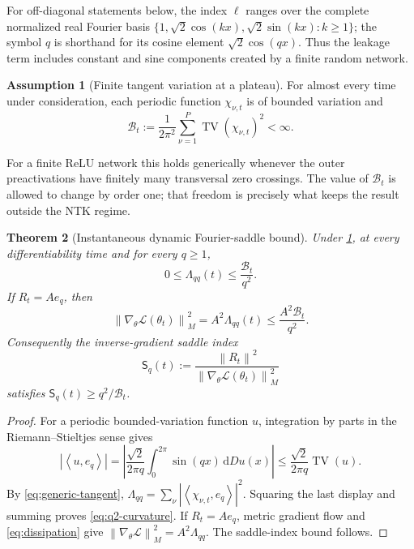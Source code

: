 \documentclass[11pt]{article}
\newcommand{\1}{\mathbf 1}
\newcommand{\ip}[2]{\left\langle #1,#2\right\rangle}
\newcommand{\norm}[1]{\left\lVert #1\right\rVert}
\newcommand{\TV}{\operatorname{TV}}
\newcommand{\dd}{\mathrm d}
\newcommand{\cL}{\mathcal L}
\newcommand{\cB}{\mathcal B}
\theoremstyle{plain}
\newtheorem{theorem}{Theorem}[section]
\theoremstyle{definition}
\newtheorem{assumption}[theorem]{Assumption}
\begin{document}
For off-diagonal statements below, the index \(\ell\) ranges over the
complete normalized real Fourier basis
\(\{1,\sqrt2\cos(kx),\sqrt2\sin(kx):k\ge1\}\); the symbol \(q\) is shorthand
for its cosine element \(\sqrt2\cos(qx)\).  Thus the leakage term includes
constant and sine components created by a finite random network.

\begin{assumption}[Finite tangent variation at a plateau]
\label{ass:BV}
For almost every time under consideration, each periodic function
\(\chi_{\nu,t}\) is of bounded variation and
\begin{equation}
 \cB_t:=\frac1{2\pi^2}\sum_{\nu=1}^P
 \TV(\chi_{\nu,t})^2<\infty.
 \label{eq:variation-budget}
\end{equation}
\end{assumption}

For a finite ReLU network this holds generically whenever the outer
preactivations have finitely many transversal zero crossings.  The value of
\(\cB_t\) is allowed to change by order one; that freedom is precisely what
keeps the result outside the NTK regime.

\begin{theorem}[Instantaneous dynamic Fourier-saddle bound]
\label{thm:dynamic-saddle}
Under \cref{ass:BV}, at every differentiability time and for every \(q\ge1\),
\begin{equation}
 0\leq\Lambda_{qq}(t)\leq\frac{\cB_t}{q^2}.
 \label{eq:q2-curvature}
\end{equation}
If \(R_t=Ae_q\), then
\begin{equation}
 \norm{\nabla_\theta\cL(\theta_t)}_{M}^2
 =A^2\Lambda_{qq}(t)
 \leq\frac{A^2\cB_t}{q^2}.
 \label{eq:gradient-bound}
\end{equation}
Consequently the inverse-gradient saddle index
\begin{equation}
 \mathsf S_q(t):=\frac{\norm{R_t}^2}
 {\norm{\nabla_\theta\cL(\theta_t)}_{M}^2}
 \label{eq:saddle-index}
\end{equation}
satisfies \(\mathsf S_q(t)\ge q^2/\cB_t\).
\end{theorem}

\begin{proof}
For a periodic bounded-variation function \(u\), integration by parts in
the Riemann--Stieltjes sense gives
\[
 \left|\ip{u}{e_q}\right|
 =\left|\frac{\sqrt2}{2\pi q}\int_0^{2\pi}\sin(qx)\,\dd Du(x)\right|
 \leq\frac{\sqrt2}{2\pi q}\TV(u).
\]
By \eqref{eq:generic-tangent},
\(\Lambda_{qq}=\sum_\nu|\ip{\chi_{\nu,t}}{e_q}|^2\).  Squaring the last
display and summing proves \eqref{eq:q2-curvature}.  If \(R_t=Ae_q\), metric
gradient flow and \eqref{eq:dissipation} give
\(\norm{\nabla_\theta\cL}_{M}^2=A^2\Lambda_{qq}\).  The saddle-index bound
follows.
\end{proof}
\end{document}
